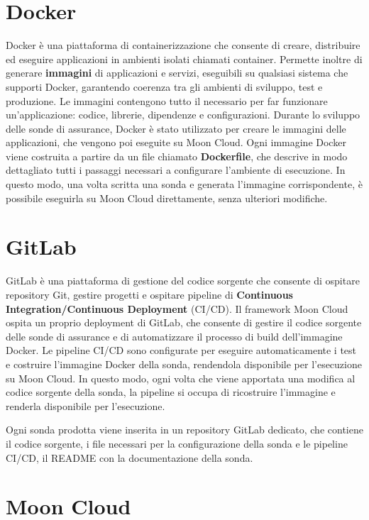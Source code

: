 \section{Docker}
\label{sec:docker}

Docker è una piattaforma di containerizzazione che consente di creare, distribuire ed eseguire applicazioni in ambienti isolati chiamati container. Permette inoltre di generare \textbf{immagini} di applicazioni e servizi, eseguibili su qualsiasi sistema che supporti Docker, garantendo coerenza tra gli ambienti di sviluppo, test e produzione. Le immagini contengono tutto il necessario per far funzionare un'applicazione: codice, librerie, dipendenze e configurazioni. Durante lo sviluppo delle sonde di assurance, Docker è stato utilizzato per creare le immagini delle applicazioni, che vengono poi eseguite su Moon Cloud. Ogni immagine Docker viene costruita a partire da un file chiamato \textbf{Dockerfile}, che descrive in modo dettagliato tutti i passaggi necessari a configurare l'ambiente di esecuzione. In questo modo, una volta scritta una sonda e generata l'immagine corrispondente, è possibile eseguirla su Moon Cloud direttamente, senza ulteriori modifiche.

\section{GitLab}
\label{sec:gitlab}

GitLab è una piattaforma di gestione del codice sorgente che consente di ospitare repository Git, gestire progetti e ospitare pipeline di \textbf{Continuous Integration/Continuous Deployment} (CI/CD). Il framework Moon Cloud ospita un proprio deployment di GitLab, che consente di gestire il codice sorgente delle sonde di assurance e di automatizzare il processo di build dell'immagine Docker. Le pipeline CI/CD sono configurate per eseguire automaticamente i test e costruire l'immagine Docker della sonda, rendendola disponibile per l'esecuzione su Moon Cloud. In questo modo, ogni volta che viene apportata una modifica al codice sorgente della sonda, la pipeline si occupa di ricostruire l'immagine e renderla disponibile per l'esecuzione.

Ogni sonda prodotta viene inserita in un repository GitLab dedicato, che contiene il codice sorgente, i file necessari per la configurazione della sonda e le pipeline CI/CD, il README con la documentazione della sonda. 

\section{Moon Cloud}
\label{sec:Moon Cloud}

